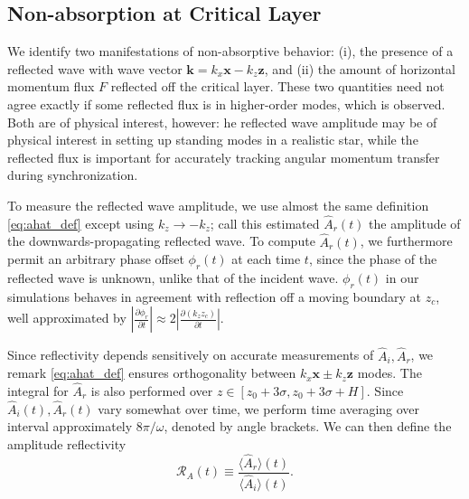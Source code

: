 \documentclass[
        fleqn,
        usenatbib,
    ]{mnras}
\newcommand*{\pd}[2]{\frac{\partial#1}{\partial#2}}
\newcommand*{\abs}[1]{\left|#1\right|}
\newcommand*{\ev}[1]{\langle#1\rangle}
\newcommand*{\bm}[1]{\boldsymbol{\mathbf{#1}}}
\begin{document}
\subsection{Non-absorption at Critical Layer}\label{ss:reflectivity}

We identify two manifestations of non-absorptive behavior: (i), the presence of
a reflected wave with wave vector $\bm{k} = k_{x}\bm{x} - k_{z}\bm{z}$, and (ii)
the amount of horizontal momentum flux $F$ reflected off the critical layer.
These two quantities need not agree exactly if some reflected flux is in
higher-order modes, which is observed. Both are of physical interest, however:
he reflected wave amplitude may be of physical interest in setting up standing
modes in a realistic star, while the reflected flux is important for accurately
tracking angular momentum transfer during synchronization.

To measure the reflected wave amplitude, we use almost the same definition
\autoref{eq:ahat_def} except using $k_{z} \to -k_{z}$; call this estimated
$\hat{A}_r(t)$ the amplitude of the downwards-propagating reflected wave. To
compute $\hat{A}_r(t)$, we furthermore permit an arbitrary phase offset
$\phi_r(t)$ at each time $t$, since the phase of the reflected wave is unknown,
unlike that of the incident wave. $\phi_r(t)$ in our simulations
behaves in agreement with reflection off a moving boundary at $z_c$,
well approximated by $\abs{\pd{\phi_r}{t}} \approx 2\abs{\pd{(k_{z}z_c)}{t}}$.

Since reflectivity depends sensitively on accurate measurements of $\hat{A}_i,
\hat{A}_r$, we remark \autoref{eq:ahat_def} ensures orthogonality between
$k_{x}\bm{x} \pm k_{z}\bm{z}$ modes. The integral for $\hat{A}_r$ is also
performed over $z \in [z_0 + 3\sigma, z_0 + 3\sigma + H]$. Since
$\hat{A}_i(t), \hat{A}_r(t)$ vary somewhat over time, we perform time averaging
over interval approximately $8\pi/\omega$, denoted by angle brackets. We can
then define the amplitude
reflectivity
\begin{equation}
    \mathcal{R}_A(t) \equiv \frac{\ev{\hat{A}_r}(t)}{\ev{\hat{A}_i}(t)}
        .\label{eq:Ra_def}
\end{equation}
\end{document}
